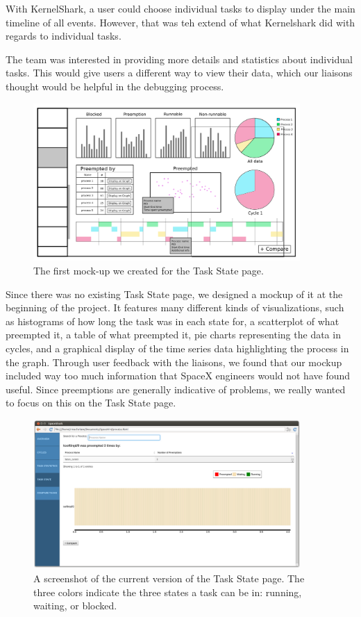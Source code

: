 \documentclass{hmcclinic}
\begin{document}
With KernelShark, a user could choose individual tasks to display under
the main timeline of all events. However, that was teh extend of what
Kernelshark did with regards to individual tasks.

The team was interested in providing more details and statistics about
individual tasks. This would give users a different way to view
their data, which our liaisons thought would be helpful
in the debugging process.

\begin{figure}[H]
\begin{center}
\includegraphics[width=4in]{perProcess-49.png}
\caption{The first mock-up we created for the Task State page.}
\end{center}
\end{figure}

Since there was no existing Task State page, we designed a mockup of it at the
beginning of the project. It features many different kinds of visualizations,
such as histograms of how long the task was in each state for, a scatterplot of 
what preempted it, a table of what preempted it, pie charts representing the 
data in cycles, and a graphical display of the time series data highlighting 
the process in the graph. Through user feedback with the liaisons, we found 
that our mockup included way too much information that SpaceX engineers would 
not have found useful. Since preemptions are generally
indicative of problems, we really wanted to focus on this on the Task State
page.

\begin{figure}[H]
\begin{center}
\includegraphics[width=4in]{task-state-page.png}
\caption{A screenshot of the current version of the Task State page. The three
colors indicate the three states a task can be in: running, waiting, or blocked.}
\end{center}
\end{figure}
\end{document}
